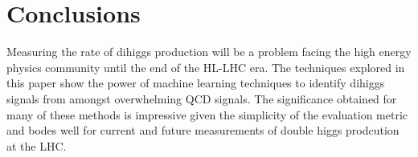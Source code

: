 \section{Conclusions}
\label{sec:conclusions}
Measuring the rate of dihiggs production will be a problem facing the high energy physics community until the end of the HL-LHC era. The techniques explored in this paper show the power of machine learning techniques to identify dihiggs signals from amongst overwhelming QCD signals. The significance obtained for many of these methods is impressive given the simplicity of the evaluation metric and bodes well for current and future measurements of double higgs prodcution at the LHC.

